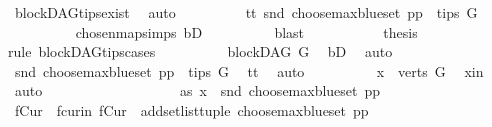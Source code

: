 \begin{isabellebody}
\ blockDAG{\isachardot}{\kern0pt}tips{\isacharunderscore}{\kern0pt}exist\ \isamarkupfalse%
\ auto\isanewline
\ \ \ \ \ \ \isamarkupfalse%
\ \isamarkupfalse%
\ tt{}{\isacharcolon}{\kern0pt}\ {\isachardoublequoteopen}snd\ {\isacharparenleft}{\kern0pt}choose{\isacharunderscore}{\kern0pt}max{\isacharunderscore}{\kern0pt}blue{\isacharunderscore}{\kern0pt}set\ pp{\isacharparenright}{\kern0pt}\ {\isasymin}\ tips\ G{\isachardoublequoteclose}\isanewline
\ \ \ \ \ \ \ \ \isamarkupfalse%
\ chosen{\isacharunderscore}{\kern0pt}map{\isacharunderscore}{\kern0pt}simps\ bD\isanewline
\ \ \ \ \ \ \ \ \isamarkupfalse%
\ blast\ \ \ \isanewline
\ \ \ \ \ \ \isamarkupfalse%
\ {\isacharquery}{\kern0pt}thesis\ \isanewline
\ \ \ \ \ \ \isamarkupfalse%
{\isacharparenleft}{\kern0pt}rule\ blockDAG{\isachardot}{\kern0pt}tips{\isacharunderscore}{\kern0pt}cases{\isacharparenright}{\kern0pt}\isanewline
\ \ \ \ \ \ \ \ \isamarkupfalse%
\ {\isachardoublequoteopen}blockDAG\ G{\isachardoublequoteclose}\ \isamarkupfalse%
\ bD\ \isamarkupfalse%
\ auto\isanewline
\ \ \ \ \ \ \ \ \isamarkupfalse%
\ {\isachardoublequoteopen}snd\ {\isacharparenleft}{\kern0pt}choose{\isacharunderscore}{\kern0pt}max{\isacharunderscore}{\kern0pt}blue{\isacharunderscore}{\kern0pt}set\ pp{\isacharparenright}{\kern0pt}\ {\isasymin}\ tips\ G{\isachardoublequoteclose}\ \isamarkupfalse%
\ tt{}\ \isamarkupfalse%
\ auto\isanewline
\ \ \ \ \ \ \ \ \isamarkupfalse%
\ {\isachardoublequoteopen}x\ {\isasymin}\ verts\ G{\isachardoublequoteclose}\ \isamarkupfalse%
\ x{\isacharunderscore}{\kern0pt}in\ \isamarkupfalse%
\ auto\isanewline
\ \ \ \ \ \ \isamarkupfalse%
\ \ \isanewline
\ \ \ \ \ \ \ \ \isamarkupfalse%
\ as{}{\isacharcolon}{\kern0pt}\ {\isachardoublequoteopen}x\ {\isacharequal}{\kern0pt}\ snd\ {\isacharparenleft}{\kern0pt}choose{\isacharunderscore}{\kern0pt}max{\isacharunderscore}{\kern0pt}blue{\isacharunderscore}{\kern0pt}set\ pp{\isacharparenright}{\kern0pt}{\isachardoublequoteclose}\isanewline
\ \ \ \ \ \ \ \ \isamarkupfalse%
\ fCur\ \ fcur{\isacharunderscore}{\kern0pt}in{\isacharcolon}{\kern0pt}\ {\isachardoublequoteopen}fCur\ {\isacharequal}{\kern0pt}\ add{\isacharunderscore}{\kern0pt}set{\isacharunderscore}{\kern0pt}list{\isacharunderscore}{\kern0pt}tuple\ {\isacharparenleft}{\kern0pt}choose{\isacharunderscore}{\kern0pt}max{\isacharunderscore}{\kern0pt}blue{\isacharunderscore}{\kern0pt}set\ pp{\isacharparenright}{\kern0pt}{\isachardoublequoteclose}\isanewline

\end{isabellebody}

